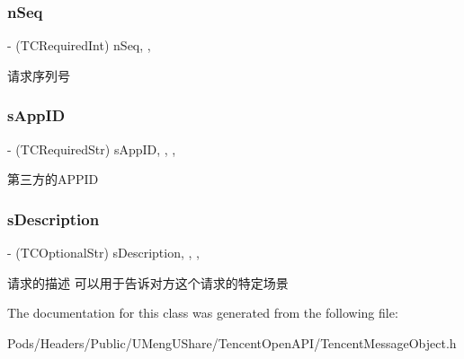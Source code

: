 \subsubsection{\texorpdfstring{n\+Seq}{nSeq}}
{\footnotesize\ttfamily -\/ (T\+C\+Required\+Int) n\+Seq\hspace{0.3cm}{\ttfamily [read]}, {\ttfamily [nonatomic]}, {\ttfamily [assign]}}

请求序列号 \mbox{\label{interface_tencent_api_req_a7c67c89447a66af8f7f3087277cc8e49}} 
\subsubsection{\texorpdfstring{s\+App\+ID}{sAppID}}
{\footnotesize\ttfamily -\/ (T\+C\+Required\+Str) s\+App\+ID\hspace{0.3cm}{\ttfamily [read]}, {\ttfamily [write]}, {\ttfamily [nonatomic]}, {\ttfamily [retain]}}

第三方的\+A\+P\+P\+ID \mbox{\label{interface_tencent_api_req_a6dabf04ecc537c1f4d23691cdb499649}} 
\subsubsection{\texorpdfstring{s\+Description}{sDescription}}
{\footnotesize\ttfamily -\/ (T\+C\+Optional\+Str) s\+Description\hspace{0.3cm}{\ttfamily [read]}, {\ttfamily [write]}, {\ttfamily [nonatomic]}, {\ttfamily [retain]}}

请求的描述 可以用于告诉对方这个请求的特定场景 

The documentation for this class was generated from the following file\+:\begin{DoxyCompactItemize}
\item 
Pods/\+Headers/\+Public/\+U\+Meng\+U\+Share/\+Tencent\+Open\+A\+P\+I/Tencent\+Message\+Object.\+h\end{DoxyCompactItemize}
